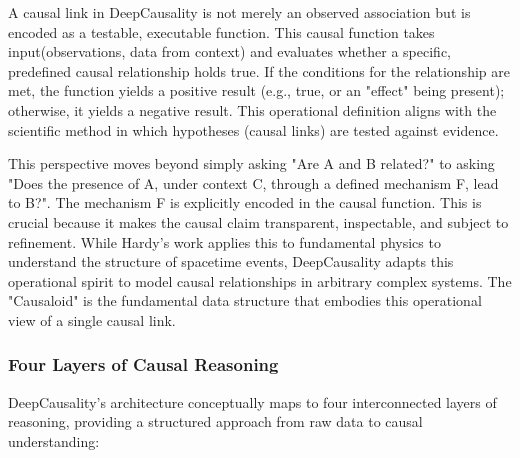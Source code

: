 A causal link in DeepCausality is not merely an observed association but is encoded as a testable, executable function. This causal function takes input(observations, data from context) and evaluates whether a specific, predefined causal relationship holds true. If the conditions for the relationship are met, the function yields a positive result (e.g., true, or an "effect" being present); otherwise, it yields a negative result. This operational definition aligns with the scientific method in which hypotheses (causal links) are tested against evidence.

This perspective moves beyond simply asking "Are A and B related?" to asking "Does the presence of A, under context C, through a defined mechanism F, lead to B?". The mechanism F is explicitly encoded in the causal function. This is crucial because it makes the causal claim transparent, inspectable, and subject to refinement. While Hardy's work applies this to fundamental physics to understand the structure of spacetime events, DeepCausality adapts this operational spirit to model causal relationships in arbitrary complex systems. The "Causaloid" is the fundamental data structure that embodies this operational view of a single causal link.

\newpage

\subsubsection{Four Layers of Causal Reasoning}

DeepCausality's architecture conceptually maps to four interconnected layers of reasoning, providing a structured approach from raw data to causal understanding:

